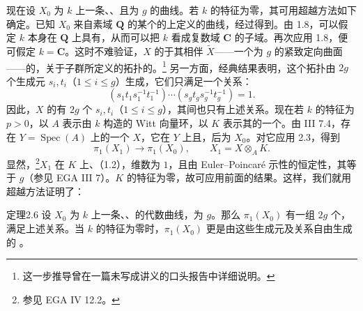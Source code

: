 现在设 $X_0$ 为 $k$ 上一条、、且为 $g$ 的曲线。若 $k$ 的特征为零，其可用超越方法如下确定。已知 $X_0$ 来自素域 $\mathbf Q$ 的某个的上定义的曲线，经过得到。由 1.8，可以假定 $k$ 本身在 $\mathbf Q$ 上具有，从而可以把 $k$ 看成复数域 $\mathbf C$ 的子域。再次应用 1.8，便可假定 $k=\mathbf C$。这时不难验证，$X$ 的于其相伴 $\widetilde X$——一个为 $g$ 的紧致定向曲面——的，关于子群所定义的拓扑的。\footnote{这一步推导曾在一篇未写成讲义的口头报告中详细说明。}
另一方面，经典结果表明，这个拓扑由 $2g$ 个生成元 $s_i,t_i$（$1\leq i\leq g$）生成，它们只满足一个关系：
\[
(s_1t_1s_1^{-1}t_1^{-1})\cdots(s_gt_gs_g^{-1}t_g^{-1})=1.
\]
因此，$X$ 的有 $2g$ 个 $s_i,t_i$（$1\leq i\leq g$），其间也只有上述关系。现在若 $k$ 的特征为 $p>0$，以 $A$ 表示由 $k$ 构造的 Witt 向量环，以 $K$ 表示其的一个。由 III 7.4，存在 $Y=\operatorname{Spec}(A)$ 上的一个 $X$，它在 $Y$ 上且，后为 $X_0$。对它应用 2.3，得到
\[
\pi_1(X_1)\longrightarrow\pi_1(X_0),\qquad X_1=X\otimes_A K.
\]
显然，\footnote{参见 EGA IV 12.2。}$X_1$ 在 $K$ 上、（1.2），维数为 $1$，且由 Euler–Poincaré 示性的恒定性，其等于 $g$（参见 EGA III 7）。$K$ 的特征为零，故可应用前面的结果。这样，我们就用超越方法证明了：
\begin{SGAresult}{定理}{2.6}
设 $X_0$ 为 $k$ 上一条、、的代数曲线，为 $g$。那么 $\pi_1(X_0)$ 有一组 $2g$ 个，满足上述关系。当 $k$ 的特征为零时，$\pi_1(X_0)$ 更是由这些生成元及关系自由生成的 。
\end{SGAresult}
